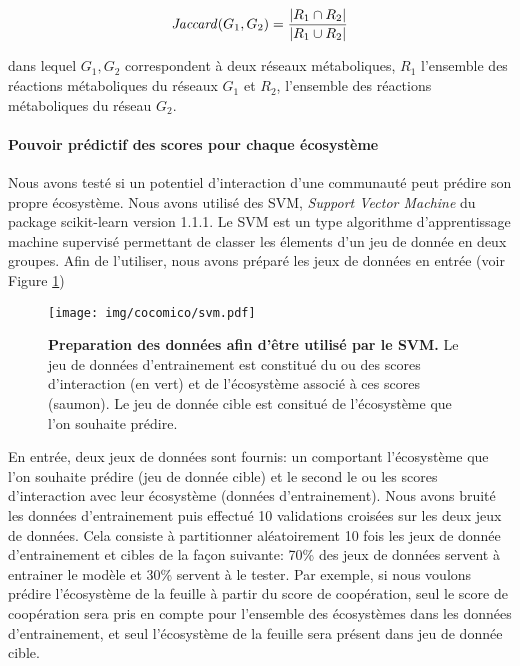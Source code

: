 \documentclass[../main.tex]{subfiles}
\begin{document}
\begin{equation}
\label{eq:jaccard}
    \mbox{\textit{Jaccard}}(G_1, G_2) = 
    \frac{\vert R_1 \cap R_2 \vert}{\vert R_1 \cup R_2 \vert}
\end{equation}

dans lequel $G_1, G_2$ correspondent à deux réseaux métaboliques, $R_1$ l'ensemble des réactions métaboliques du réseaux $G_1$ et $R_2$, l'ensemble des réactions métaboliques du réseau $G_2$.

\paragraph*{Pouvoir prédictif des scores pour chaque écosystème}
Nous avons testé si un potentiel d'interaction d'une communauté peut prédire son propre écosystème. Nous avons utilisé des SVM, \textit{Support Vector Machine} du package scikit-learn version 1.1.1. Le SVM est un type algorithme d'apprentissage machine supervisé permettant de classer les élements d'un jeu de donnée en deux groupes. Afin de l'utiliser, nous avons préparé les jeux de données en entrée (voir Figure \ref{fig:svm})

\begin{figure}[H]
    \centering
    \texttt{[image: img/cocomico/svm.pdf]}
    \caption{\textbf{Preparation des données afin d'être utilisé par le SVM.} Le jeu de données d'entrainement est constitué du ou des scores d'interaction (en vert) et de l'écosystème associé à ces scores (saumon). Le jeu de donnée cible est consitué de l'écosystème que l'on souhaite prédire.}
    \label{fig:svm}
\end{figure}


En entrée, deux jeux de données sont fournis: un comportant l'écosystème que l'on souhaite prédire (jeu de donnée cible) et le second le ou les scores d'interaction avec leur écosystème (données d'entrainement). Nous avons bruité les données d'entrainement puis effectué 10 validations croisées sur les deux jeux de données. Cela consiste à partitionner aléatoirement 10 fois les jeux de donnée d'entrainement et cibles de la façon suivante: 70\% des jeux de données servent à entrainer le modèle et 30\% servent à le tester. Par exemple, si nous voulons prédire l'écosystème de la feuille à partir du score de coopération, seul le score de coopération sera pris en compte pour l'ensemble des écosystèmes dans les données d'entrainement, et seul l'écosystème de la feuille sera présent dans jeu de donnée cible. 
\end{document}
